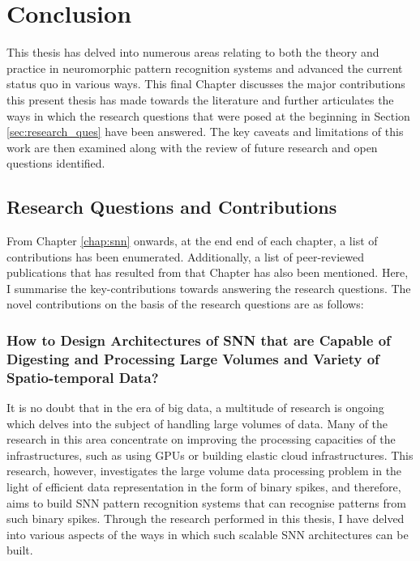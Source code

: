\chapter{Conclusion}
\label{chap:conclusion}
This thesis has delved into numerous areas relating to both the theory and practice in neuromorphic pattern recognition systems and advanced the current status quo in various ways. This final Chapter discusses the major contributions this present thesis has made towards the literature and further articulates the ways in which the research questions that were posed at the beginning in Section \ref{sec:research_ques} have been answered. The key caveats and limitations of this work are then examined along with the review of future research and open questions identified.

\section{Research Questions and Contributions}

From Chapter \ref{chap:snn} onwards, at the end end of each chapter, a list of contributions has been enumerated. Additionally, a list of peer-reviewed publications that has resulted from that Chapter has also been mentioned. Here, I summarise the key-contributions towards answering the research questions. The novel contributions on the basis of the research questions are as follows:

\subsection{How to Design Architectures of SNN that are Capable of Digesting and Processing Large Volumes and Variety of Spatio-temporal Data?} 

It is no doubt that in the era of big data, a multitude of research is ongoing which delves into the subject of handling large volumes of data. Many of the research in this area concentrate on improving the processing capacities of the infrastructures, such as using GPUs or building elastic cloud infrastructures. This research, however, investigates the large volume data processing problem in the light of efficient data representation in the form of binary spikes, and therefore, aims to build SNN pattern recognition systems that can recognise patterns from such binary spikes. Through the research performed in this thesis, I have delved into various aspects of the ways in which such scalable SNN architectures can be built. 

